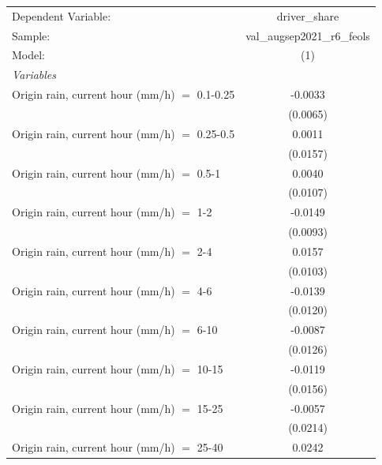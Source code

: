 \ifdefined\ifclassloaded
{}
\fi

\begingroup
\centering
\begin{tabular}{lc}
   \tabularnewline \midrule \midrule
   Dependent Variable:                           & driver\_share\\   
   Sample:                                       & val\_augsep2021\_r6\_feols \\      
   Model:                                        & (1)\\  
   \midrule
   \emph{Variables}\\
   Origin rain, current hour (mm/h) $=$ 0.1-0.25 & -0.0033\\   
                                                 & (0.0065)\\   
   Origin rain, current hour (mm/h) $=$ 0.25-0.5 & 0.0011\\   
                                                 & (0.0157)\\   
   Origin rain, current hour (mm/h) $=$ 0.5-1    & 0.0040\\   
                                                 & (0.0107)\\   
   Origin rain, current hour (mm/h) $=$ 1-2      & -0.0149\\   
                                                 & (0.0093)\\   
   Origin rain, current hour (mm/h) $=$ 2-4      & 0.0157\\   
                                                 & (0.0103)\\   
   Origin rain, current hour (mm/h) $=$ 4-6      & -0.0139\\   
                                                 & (0.0120)\\   
   Origin rain, current hour (mm/h) $=$ 6-10     & -0.0087\\   
                                                 & (0.0126)\\   
   Origin rain, current hour (mm/h) $=$ 10-15    & -0.0119\\   
                                                 & (0.0156)\\   
   Origin rain, current hour (mm/h) $=$ 15-25    & -0.0057\\   
                                                 & (0.0214)\\   
   Origin rain, current hour (mm/h) $=$ 25-40    & 0.0242\\   

\end{tabular}
